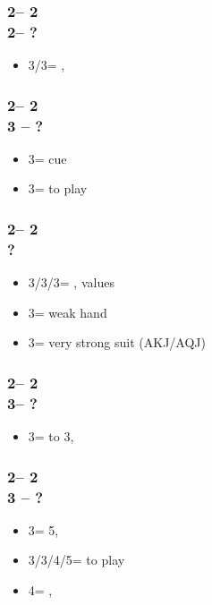 \subsubsection*{2\hearts -- 2\spades\\
                2\nt -- ?}
\begin{itemize}
    \item 3\clubs/3\diams = \nat, \inv
\end{itemize}

\subsubsection*{2\hearts -- 2\spades\\
                3 -- ?}
\begin{itemize}
    \item 3\spades = cue
    \item 3\nt = to play
\end{itemize}

\subsubsection*{2\hearts -- 2\nt\\
                ?}
\begin{itemize}
    \item 3\clubs/3\diams/3\spades = \nat, \nt values
    \item 3\hearts = weak hand
    \item 3\nt = very strong suit (AKJ/AQJ)
\end{itemize}

\subsubsection*{2\hearts -- 2\nt\\
                3\clubs -- ?}
\begin{itemize}
    \item 3\diams = \inv to 3\nt, \nat
\end{itemize}

\subsubsection*{2\hearts -- 2\nt\\
                3 -- ?}
\begin{itemize}
    \item 3\spades = 5\spades, \gf
    \item 3\hearts/3\nt/4\major/5\minor = to play
    \item 4\nt = \inv, \nat
\end{itemize}

